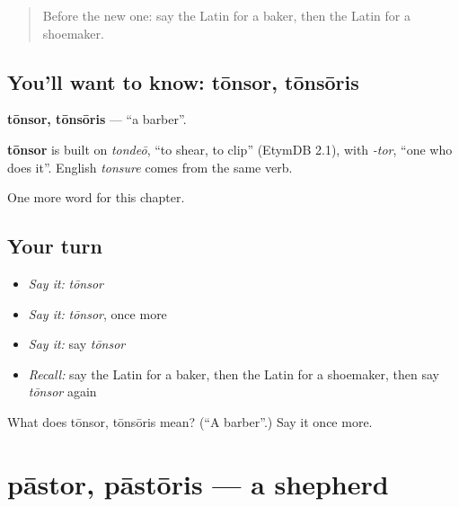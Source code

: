 \label{lesson:LA-C137-tonsor}



\begin{quote}
Before the new one: say the Latin for a baker, then the Latin for a shoemaker.
\end{quote}

\subsection*{You'll want to know: tōnsor, tōnsōris}
\textbf{tōnsor, tōnsōris} — \textquotedblleft{}a barber\textquotedblright{}.

\begin{cousinweb}
\textbf{tōnsor} is built on \emph{tondeō}, \textquotedblleft{}to shear, to clip\textquotedblright{} (EtymDB 2.1), with \emph{-tor}, \textquotedblleft{}one who does it\textquotedblright{}. English \emph{tonsure} comes from the same verb.
\end{cousinweb}

\begin{grammarlens}[title={What you've built}]
One more word for this chapter.
\end{grammarlens}

\subsection*{Your turn}
\begin{itemize}
\raggedright
  \item \emph{Say it:} \emph{tōnsor}
  \item \emph{Say it:} \emph{tōnsor}, once more
  \item \emph{Say it:} say \emph{tōnsor}
  \item \emph{Recall:} say the Latin for a baker, then the Latin for a shoemaker, then say \emph{tōnsor} again
\end{itemize}

\begin{tcolorbox}[breakable,colback=teal!4,colframe=teal!35!black,title={Before you move on}]
What does tōnsor, tōnsōris mean? (\textquotedblleft{}A barber\textquotedblright{}.) Say it once more.
\end{tcolorbox}
\section[pāstor, pāstōris]{pāstor, pāstōris — a shepherd}

\label{lesson:LA-C137-pastor}



